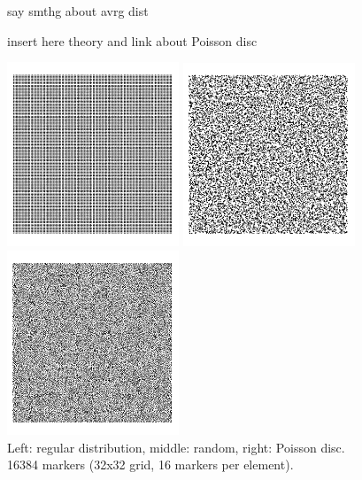 {\color{red} say smthg about avrg dist}  

{\color{red} insert here theory and link about Poisson disc }

\begin{center}
\includegraphics[width=5.134cm]{python_codes/fieldstone_13/images/markers_reg} 
\includegraphics[width=5.134cm]{python_codes/fieldstone_13/images/markers_rand} 
\includegraphics[width=5.134cm]{python_codes/fieldstone_13/images/markers_pd} \\
{\small Left: regular distribution, middle: random, right: Poisson disc.\\
 16384 markers (32x32 grid, 16 markers per element).}
\end{center}



